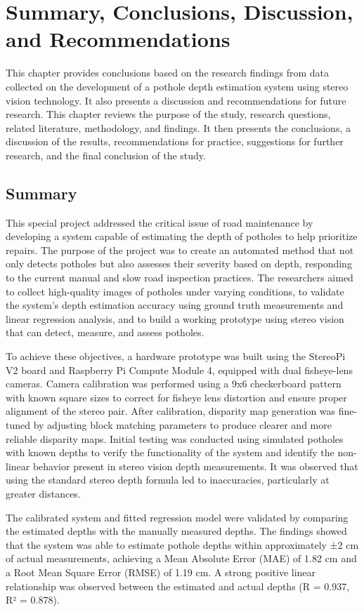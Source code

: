 \chapter{Summary, Conclusions, Discussion, and Recommendations}
This chapter provides conclusions based on the research findings from data collected on the development of a pothole depth estimation system using stereo vision technology. It also presents a discussion and recommendations for future research. This chapter reviews the purpose of the study, research questions, related literature, methodology, and findings. It then presents the conclusions, a discussion of the results, recommendations for practice, suggestions for further research, and the final conclusion of the study.

\section{Summary}
This special project addressed the critical issue of road maintenance by developing a system capable of estimating the depth of potholes to help prioritize repairs. The purpose of the project was to create an automated method that not only detects potholes but also assesses their severity based on depth, responding to the current manual and slow road inspection practices. The researchers aimed to collect high-quality images of potholes under varying conditions, to validate the system’s depth estimation accuracy using ground truth measurements and linear regression analysis, and to build a working prototype using stereo vision that can detect, measure, and assess potholes. 

To achieve these objectives, a hardware prototype was built using the StereoPi V2 board and Raspberry Pi Compute Module 4, equipped with dual fisheye-lens cameras. Camera calibration was performed using a 9x6 checkerboard pattern with known square sizes to correct for fisheye lens distortion and ensure proper alignment of the stereo pair. After calibration, disparity map generation was fine-tuned by adjusting block matching parameters to produce clearer and more reliable disparity maps. Initial testing was conducted using simulated potholes with known depths to verify the functionality of the system and identify the non-linear behavior present in stereo vision depth measurements. It was observed that using the standard stereo depth formula led to inaccuracies, particularly at greater distances. 

The calibrated system and fitted regression model were validated by comparing the estimated depths with the manually measured depths. The findings showed that the system was able to estimate pothole depths within approximately ±2 cm of actual measurements, achieving a Mean Absolute Error (MAE) of 1.82 cm and a Root Mean Square Error (RMSE) of 1.19 cm. A strong positive linear relationship was observed between the estimated and actual depths (R = 0.937, R² = 0.878).

